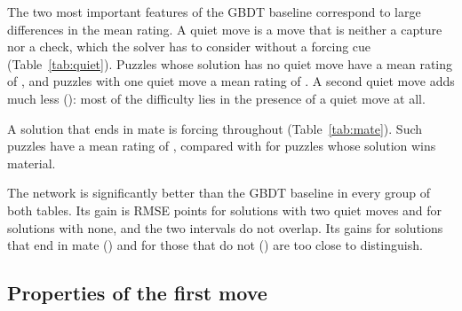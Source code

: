 \documentclass[11pt]{article}
\begin{document}
The two most important features of the GBDT baseline correspond to large
differences in the mean rating. A quiet move is a move that is neither a
capture nor a check, which the solver has to consider without a forcing cue
(Table~\ref{tab:quiet}). Puzzles whose solution has no quiet move have a mean
rating of , and puzzles with one quiet move a mean
rating of . A second quiet move adds much less
(): most of the difficulty lies in the presence of
a quiet move at all.

A solution that ends in mate is forcing throughout
(Table~\ref{tab:mate}). Such puzzles have a mean rating of
, compared with  for
puzzles whose solution wins material.

The network is significantly better than the GBDT baseline in every group of
both tables. Its gain is  RMSE points for solutions
with two quiet moves and  for solutions with none, and
the two intervals do not overlap. Its gains for solutions that end in mate
() and for those that do not ()
are too close to distinguish.

\begin{table}[htbp]\centering\footnotesize
{}
\caption{Test-set results by the number of quiet moves (neither captures nor
checks) among the solver's moves.}
\label{tab:quiet}
\end{table}

\begin{table}[htbp]\centering\footnotesize
{}
\caption{Test-set results by whether the solution ends in mate.}
\label{tab:mate}
\end{table}

\subsection{Properties of the first move}
\end{document}
